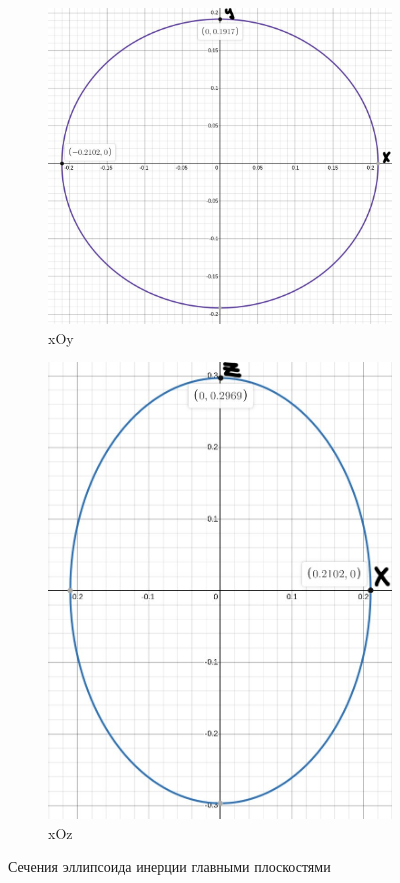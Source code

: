 \begin{figure}[!htbp]
\centering
\begin{subfigure}{.5\textwidth}
  \centering
  \includegraphics[width=1.13\linewidth]{pictures/graf1.png}
  \caption{xOy}
  \label{graf1}
\end{subfigure}%
\begin{subfigure}{.5\textwidth}
  \centering
  \includegraphics[width=0.8\linewidth]{pictures/graf2.png}
  \caption{xOz}
  \label{graf2}
\end{subfigure}
\label{fig:test}
\caption{Сечения эллипсоида инерции главными плоскостями}
\end{figure}

